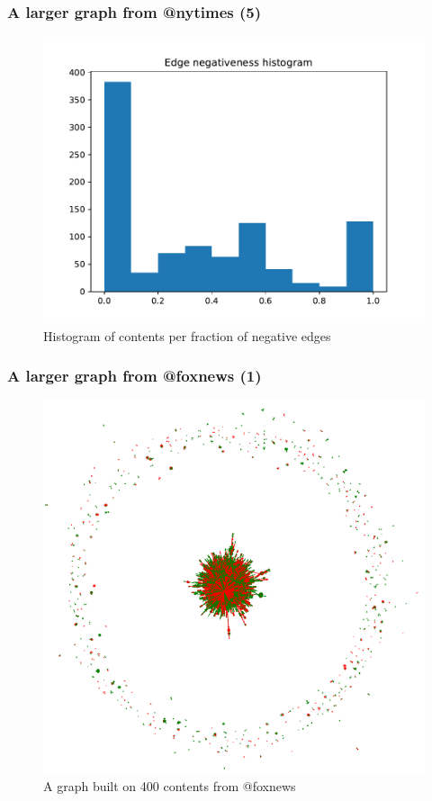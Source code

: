 \documentclass{beamer}
\begin{document}
\begin{frame}[c]
    \frametitle{A larger graph from @nytimes (5)}
    \begin{figure}[htpb]
        \centering
        \includegraphics[width=0.8\linewidth]{out/nytimes400/nytimes400-neg-fraction-hist.pdf}
        \caption{Histogram of contents per fraction of negative edges}%
    \end{figure}
\end{frame}

\begin{frame}[c]
    \frametitle{A larger graph from @foxnews (1)}
    \begin{figure}[htpb]
        \centering
        \includegraphics[width=0.7\linewidth]{img/foxnews-graph.png}
        \caption{A graph built on 400 contents from @foxnews}%
    \end{figure}
\end{frame}
\end{document}
